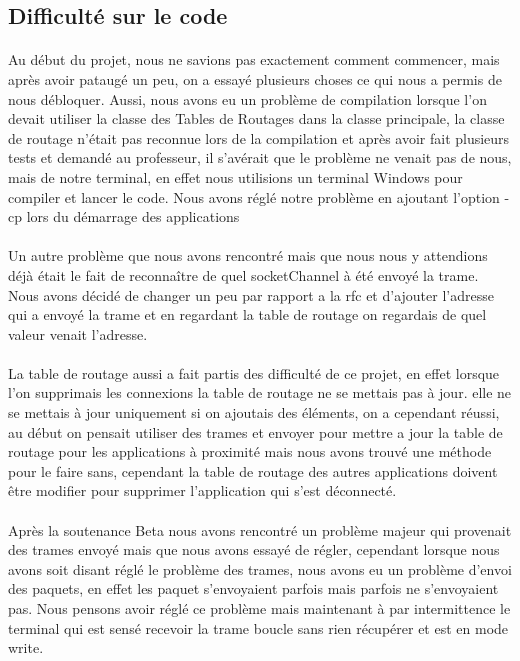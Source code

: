 \documentclass[a4paper,titlepage]{report}
\begin{document}
\subsection{Difficulté sur le code}
\paragraph{}
Au début du projet, nous ne savions pas exactement comment commencer, mais après avoir pataugé un peu, on a essayé plusieurs choses ce qui nous a permis  de nous débloquer.
Aussi, nous avons eu un problème de compilation lorsque l'on devait utiliser la classe des Tables de Routages dans la classe principale, la classe de routage n'était pas reconnue lors de la compilation et après avoir fait plusieurs tests et demandé au professeur, il s'avérait que le problème ne venait pas de nous, mais de notre terminal, en effet nous utilisions un terminal Windows pour compiler et lancer le code.
Nous avons réglé notre problème en ajoutant l'option -cp lors du démarrage des applications
\paragraph{}
Un autre problème que nous avons rencontré mais que nous nous y attendions déjà était le fait de reconnaître de quel socketChannel à été envoyé la trame.
Nous avons décidé de changer un peu par rapport a la rfc et d'ajouter l'adresse qui a envoyé la trame et en regardant la table de routage on regardais de quel valeur venait l'adresse.
\paragraph{}
La table de routage aussi a fait partis des difficulté de ce projet, en effet lorsque l'on supprimais les connexions la table de routage ne se mettais pas à jour. elle ne se mettais à jour uniquement si on ajoutais des éléments, on a cependant réussi, au début on pensait utiliser des trames et envoyer pour mettre a jour la table de routage pour les applications à proximité mais nous avons trouvé une méthode pour le faire sans, cependant la table de routage des autres applications doivent être modifier pour supprimer l'application qui s'est déconnecté.
\paragraph{}
Après la soutenance Beta nous avons rencontré un problème majeur qui provenait des trames envoyé mais que nous avons essayé de régler, cependant lorsque nous avons soit disant réglé le problème des trames, nous avons eu un problème d'envoi des paquets, en effet les paquet s'envoyaient parfois mais parfois ne s'envoyaient pas.
Nous pensons avoir réglé ce problème mais maintenant à par intermittence le terminal qui est sensé recevoir la trame boucle sans rien récupérer et est en mode write.
\end{document}
